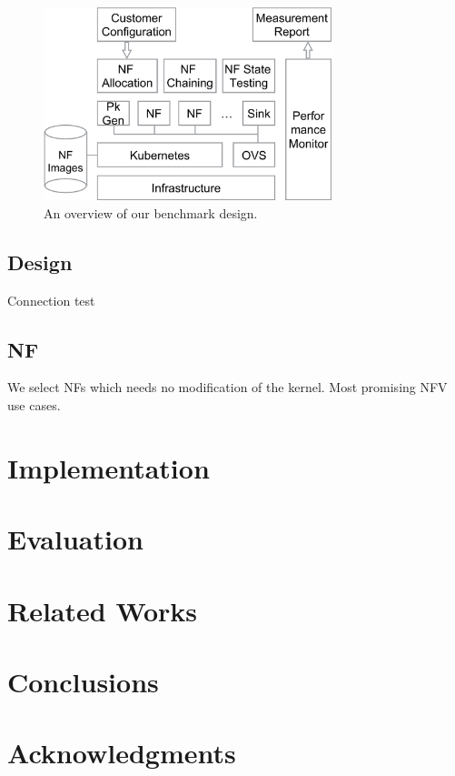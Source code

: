 \documentclass{sig-alternate-10pt}
\begin{document}
\begin{figure}[t]
\label{design}
\centering
\includegraphics[width=3.3in]{design.pdf}
\caption{An overview of our benchmark design.}
\end{figure}

\subsection{Design}
Connection test

\subsection{NF}
We select NFs which needs no modification of the kernel.
Most promising NFV use cases.

\cite{salas:calculus, Lamport:LaTeX}



\section{Implementation}


\section{Evaluation}


\section{Related Works}
\section{Conclusions}


\section{Acknowledgments}
\end{document}

